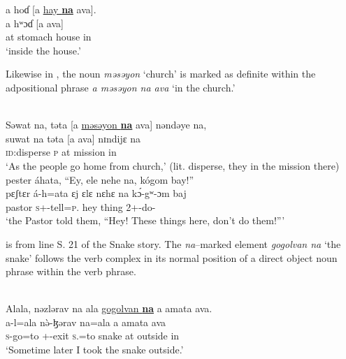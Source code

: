       \medskip
a  hoɗ  [a  \underline{hay  \textbf{na}}  ava].\\      
\gll a     hʷɔɗ      [a               ava]\\
     at   stomach {\GEN} house   {\PSP}    in\\
\glt  ‘inside the house.'
\z

Likewise in , the noun \textit{məsəyon} ‘church’ is marked as definite within the adpositional phrase \textit{a məsəyon na ava} ‘in the church.’ 

\ea \label{ex:11:43}
\\
Səwat  na,  təta  [a  \underline{məsəyon  \textbf{na}}  ava]  nəndəye  na,\\  
\gll  suwat   na   təta   [a        ava]     nɪndijɛ  na  \\     
      \textsc{id}:disperse  {\PSP}  \textsc{p}      at  mission  {\PSP}    in  {\DEM}  {\PSP}  \\    
      \glt ‘As the people go home from church,' (lit. disperse, they in the mission there)\\
 
      \medskip
pester  áhata,   “Ey, ele  nehe  na,  kógom  bay!” \\      
\gll pɛʃtɛr  á-h=ata   ɛj ɛlɛ nɛhɛ na   k\'{ɔ}-gʷ-ɔm    baj\\
     pastor  \textsc{s}+{\IFV}-tell=\textsc{p}.{\IO}   hey    thing  {\DEM}  {\PSP}  2+{\IFV}-do-{\twoP}    {\NEG}\\
\glt  ‘the Pastor told them, “Hey! These things here, don’t do them!”’
\z

 is from line S. 21 of the Snake story. The \textit{na}–marked element \textit{gogolvan  na} ‘the snake’ follows the verb complex in its normal position of a direct object noun phrase within the verb phrase. 

\ea \label{ex:11:44}
\\
Alala,  nəzlərav  na  ala  \underline{gogolvan  \textbf{na}}  a  amata  ava.\\
\gll  a-l=ala  n\`ə-ɮərav  na=ala        a  amata   ava\\
      \textsc{s}-go=to  {\oneS}+{\PFV}-exit   \textsc{s}.{\DO}=to  snake        {\PSP}    at   outside  in\\
\glt  ‘Sometime later I took the snake outside.’
\z
{}
